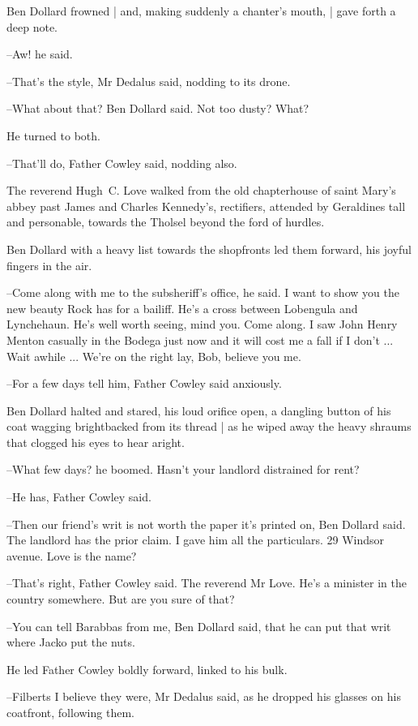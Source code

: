 Ben Dollard frowned |
and, making suddenly a chanter's mouth, |
gave forth a deep note.

--Aw!
he said.

--That's the style,
Mr Dedalus said,
nodding to its drone.

--What about that?
Ben Dollard said.
Not too dusty?
What?

He turned to both.

--That'll do,
Father Cowley said,
nodding also.

The reverend Hugh~C. Love
walked from the old chapterhouse of saint Mary's abbey
past James and Charles Kennedy's, rectifiers,
attended by Geraldines tall and personable,
towards the Tholsel beyond the ford of hurdles.

Ben Dollard
with a heavy list towards the shopfronts
led them forward,
his joyful fingers in the air.

--Come along with me to the subsheriff's office,
he said.
I want to show
you the new beauty Rock has for a bailiff.
He's a cross between Lobengula
and Lynchehaun.
He's well worth seeing, mind you.
Come along.
I saw John
Henry Menton casually in the Bodega just now
and it will cost me a fall
if I don't ...
Wait awhile ...
We're on the right lay, Bob, believe you
me.

--For a few days tell him,
Father Cowley said anxiously.

Ben Dollard halted and stared,
his loud orifice open,
a dangling button of his coat wagging brightbacked from its thread |
as he wiped away the heavy shraums that clogged his eyes
to hear aright.

--What few days?
he boomed.
Hasn't your landlord distrained for rent?

--He has,
Father Cowley said.

--Then our friend's writ is not worth the paper it's printed on,
Ben
Dollard said.
The landlord has the prior claim.
I gave him all the
particulars.
29 Windsor avenue.
Love is the name?

--That's right,
Father Cowley said.
The reverend Mr Love.
He's a minister
in the country somewhere.
But are you sure of that?

--You can tell Barabbas from me,
Ben Dollard said,
that he can put that writ where Jacko put the nuts.

He led Father Cowley boldly forward,
linked to his bulk.

--Filberts I believe they were,
Mr Dedalus said,
as he dropped his
glasses on his coatfront,
following them.


